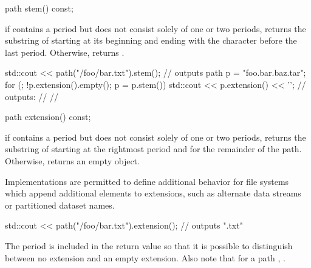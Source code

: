\begin{itemdecl}
path stem() const;
\end{itemdecl}

\begin{itemdescr}
\pnum
\returns if  contains a period but does not
  consist solely of one or two periods, returns
  the substring of  starting at its beginning and
  ending with the character before the last period. Otherwise,
  returns .

\pnum
\enterexample
\begin{codeblock}
std::cout << path("/foo/bar.txt").stem(); // outputs 
path p = "foo.bar.baz.tar";
for (; !p.extension().empty(); p = p.stem())
  std::cout << p.extension() << '\n';
  // outputs: 
  //          
  //          
\end{codeblock}
\exitexample
\end{itemdescr}

\begin{itemdecl}
path extension() const;
\end{itemdecl}

\begin{itemdescr}
\pnum
\returns if  contains a period but does not
  consist solely of one or two periods, returns
  the substring of  starting at the rightmost period
  and for the remainder of the path. Otherwise, returns an empty  object.

\pnum
\remarks Implementations are permitted to define additional
  behavior for file systems which append additional elements to extensions, such
  as alternate data streams or partitioned dataset names.

\pnum
\enterexample
\begin{codeblock}
std::cout << path("/foo/bar.txt").extension(); // outputs ".txt"
\end{codeblock}
\exitexample

\pnum
\enternote The period is included in the return value so that it is
  possible to distinguish between no extension and an empty extension. Also note
  that for a path , .
  \exitnote
\end{itemdescr}

